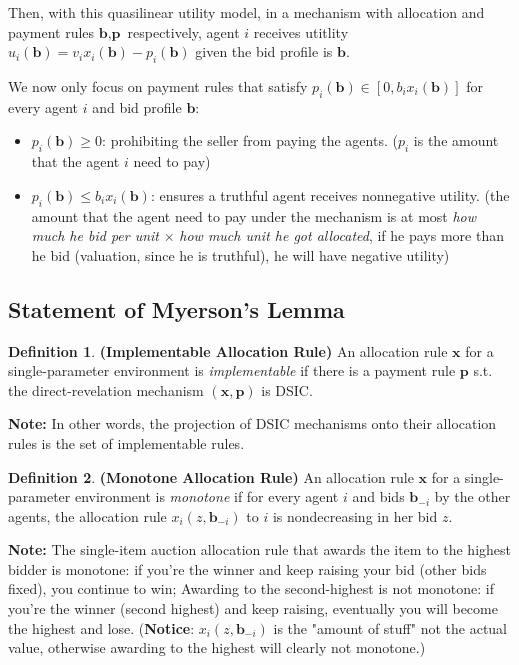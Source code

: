 \documentclass[10pt]{article}
\theoremstyle{definition}
\newtheorem{defn}{Definition}[section]
\newcommand{\Note}[0]{\noindent\textbf{Note: }}
\begin{document}
Then, with this quasilinear utility model, in a mechanism with allocation and payment rules $\textbf{b}, \textbf{p}$ respectively,
agent $i$ receives utitlity $u_{i}(\textbf{b}) = v_{i}x_{i}(\textbf{b}) - p_{i}(\textbf{b})$ given the bid profile is $\textbf{b}$.

We now only focus on payment rules that satisfy $p_{i}(\textbf{b}) \in [0, b_{i}x_{i}(\textbf{b})]$ for every agent $i$ and bid profile $\textbf{b}$:
\begin{itemize}
	\item $p_{i}(\textbf{b}) \ge 0$: prohibiting the seller from paying the agents. ($p_{i}$ is the amount that the agent $i$ need to pay)
	\item $p_{i}(\textbf{b}) \le b_{i}x_{i}(\textbf{b})$: ensures a truthful agent receives nonnegative utility.
	      (the amount that the agent need to pay under the mechanism is at most \textit{how much he bid per unit} $\times$ \textit{how much unit he got allocated},
	      if he pays more than he bid (valuation, since he is truthful), he will have negative utility)
\end{itemize}

\subsection{Statement of Myerson's Lemma}
\begin{defn} \textbf{(Implementable Allocation Rule)}
	An allocation rule $\textbf{x}$ for a single-parameter environment is \textit{implementable} if there is a payment rule $\textbf{p}$ s.t.
	the direct-revelation mechanism $(\textbf{x}, \textbf{p})$ is DSIC.
\end{defn}

\Note In other words, the projection of DSIC mechanisms onto their allocation rules is the set of implementable rules.

\begin{defn} \textbf{(Monotone Allocation Rule)}
	An allocation rule $\textbf{x}$ for a single-parameter environment is \textit{monotone} if for every agent $i$ and bids $\textbf{b}_{-i}$
	by the other agents, the allocation rule $x_{i}(z, \textbf{b}_{-i})$ to $i$ is nondecreasing in her bid $z$.
\end{defn}

\Note The single-item auction allocation rule that awards the item to the highest bidder is monotone:
if you're the winner and keep raising your bid (other bids fixed), you continue to win; Awarding to the second-highest is not monotone:
if you're the winner (second highest) and keep raising, eventually you will become the highest and lose.
(\textbf{Notice}: $x_{i}(z, \textbf{b}_{-i})$ is the "amount of stuff" not the actual value,
otherwise awarding to the highest will clearly not monotone.)
\end{document}
